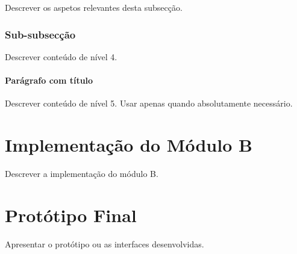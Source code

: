 Descrever os aspetos relevantes desta subsecção.

\subsubsection{Sub-subsecção}
\label{subsubsec:modulo_a_subsub}

Descrever conteúdo de nível 4.

\paragraph{Parágrafo com título}

Descrever conteúdo de nível 5. Usar apenas quando absolutamente necessário.


\section{Implementação do Módulo B}
\label{sec:modulo_b}


Descrever a implementação do módulo B.


\section{Protótipo Final}
\label{sec:prototipo}


Apresentar o protótipo ou as interfaces desenvolvidas.
